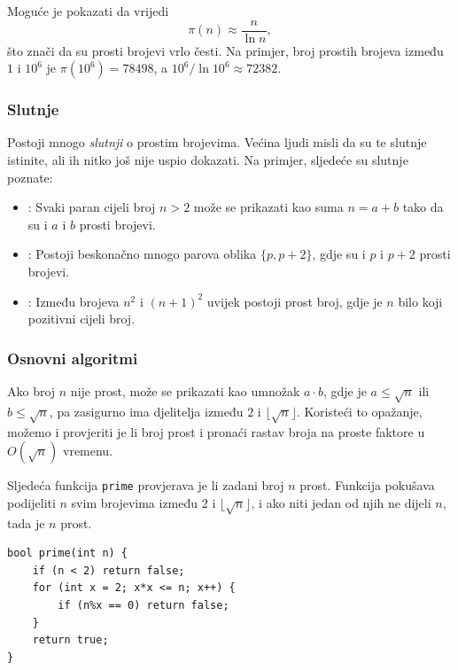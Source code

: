 Moguće je pokazati da vrijedi
\[\pi(n) \approx \frac{n}{\ln n},\]
što znači da su prosti brojevi vrlo česti.
Na primjer, broj prostih brojeva između
$1$ i $10^6$ je $\pi(10^6)=78498$,
a $10^6 / \ln 10^6 \approx 72382$.

\subsubsection{Slutnje}

Postoji mnogo \emph{slutnji} o prostim brojevima.
Većina ljudi misli da su te slutnje istinite,
ali ih nitko još nije uspio dokazati.
Na primjer, sljedeće su slutnje poznate:

\begin{itemize}
\item {}:
Svaki paran cijeli broj $n>2$ može se prikazati kao
suma $n=a+b$ tako da su i $a$ i $b$ prosti brojevi.
\item {}:
Postoji beskonačno mnogo parova
oblika $\{p,p+2\}$,
gdje su i $p$ i $p+2$ prosti brojevi.
\item {}:
Između brojeva $n^2$ i $(n+1)^2$ uvijek postoji
prost broj, gdje je $n$ bilo koji pozitivni cijeli broj.
\end{itemize}

\subsubsection{Osnovni algoritmi}

Ako broj $n$ nije prost,
može se prikazati kao umnožak $a \cdot b$,
gdje je $a \le \sqrt n$ ili $b \le \sqrt n$,
pa zasigurno ima djelitelja između $2$ i $\lfloor \sqrt n \rfloor$.
Koristeći to opažanje, možemo i provjeriti
je li broj prost i pronaći rastav broja
na proste faktore u $O(\sqrt n)$ vremenu.

Sljedeća funkcija \texttt{prime} provjerava
je li zadani broj $n$ prost.
Funkcija pokušava podijeliti $n$
svim brojevima između $2$ i $\lfloor \sqrt n \rfloor$,
i ako niti jedan od njih ne dijeli $n$, tada je $n$ prost.

\begin{lstlisting}
bool prime(int n) {
    if (n < 2) return false;
    for (int x = 2; x*x <= n; x++) {
        if (n%x == 0) return false;
    }
    return true;
}
\end{lstlisting}

